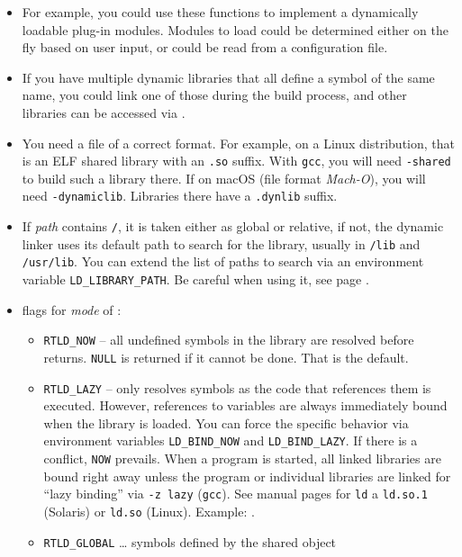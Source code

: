 \label{DLOPEN}

\begin{itemize}
\item For example, you could use these functions to implement a dynamically
loadable plug-in modules.  Modules to load could be determined either on the fly
based on user input, or could be read from a configuration file.
\item If you have multiple dynamic libraries that all define a symbol of the
same name, you could link one of those during the build process, and other
libraries can be accessed via .
\item You need a file of a correct format.  For example, on a Linux
distribution, that is an ELF shared library with an \texttt{.so} suffix.  With
\texttt{gcc}, you will need \texttt{-shared} to build such a library there.  If
on macOS (file format \emph{Mach-O}), you will need \texttt{-dynamiclib}.
Libraries there have a \texttt{.dynlib} suffix.
\item If \emph{path} contains \texttt{/}, it is taken either as global or
relative, if not, the dynamic linker uses its default path to search for the
library, usually in \texttt{/lib} and \texttt{/usr/lib}.  You can extend the
list of paths to search via an environment variable \texttt{LD\_LIBRARY\_PATH}.
Be careful when using it, see page \pageref{EVIL_LDLIBPATH}.
\item flags for \emph{mode} of :
    \begin{itemize}
    \item \texttt{RTLD\_NOW} -- all undefined symbols in the library are
    resolved before  returns. \texttt{NULL} is returned if it
    cannot be done. That is the default.
    \item \texttt{RTLD\_LAZY} -- only resolves symbols as the code that
    references them is executed.  However, references to variables are always
    immediately bound when the library is loaded.  You can force the specific
    behavior via environment variables \texttt{LD\_BIND\_NOW} and
    \texttt{LD\_BIND\_LAZY}.  If there is a conflict, \texttt{NOW} prevails.
    When a program is started, all linked libraries are bound right away unless
    the program or individual libraries are linked for ``lazy binding'' via
    \texttt{-z lazy} (\texttt{gcc}).  See manual pages for \texttt{ld} a
    \texttt{ld.so.1} (Solaris) or \texttt{ld.so} (Linux).  Example:
    .
    \item \texttt{RTLD\_GLOBAL} \dots{} symbols defined by the shared object

\end{itemize}
\end{itemize}
